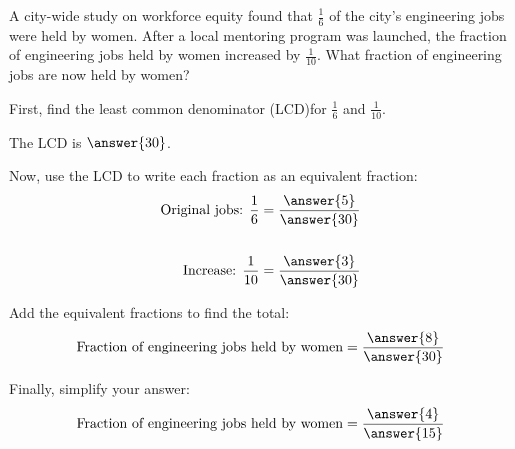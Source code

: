 \documentclass{ximera}
\begin{document}
\begin{question}
    A city-wide study on workforce equity found that $\textstyle \frac{1}{6}$ of the city's engineering jobs were held by women. After a local mentoring program was launched, the fraction of engineering jobs held by women increased by $\textstyle \frac{1}{10}$. What fraction of engineering jobs are now held by women?

    First, find the least common denominator (LCD)for $\frac{1}{6}$ and $\frac{1}{10}$.


    The LCD is $\answer{30}$.

    Now, use the LCD to write each fraction as an equivalent fraction:
    \begin{align*}
        \text{Original jobs: } \frac{1}{6} &= \frac{\answer{5}}{\answer{30}} \\
        & \\
        \text{Increase: } \frac{1}{10} &= \frac{\answer{3}}{\answer{30}}
    \end{align*}

    Add the equivalent fractions to find the total:
    \[
      \textrm{Fraction of engineering jobs held by women} = \frac{\answer{8}}{\answer{30}}
    \]

    Finally, simplify your answer:
    \[
      \textrm{Fraction of engineering jobs held by women} = \frac{\answer{4}}{\answer{15}}
    \]
\end{question}
\end{document}
